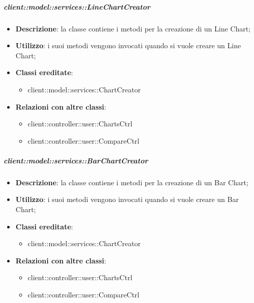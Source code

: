 		\subparagraph{client::model::services::LineChartCreator} %
		\label{subp:linechartcreator}
			\begin{itemize}
				\item \textbf{Descrizione}: la classe contiene i metodi per la creazione di un Line Chart;
				\item \textbf{Utilizzo}: i suoi metodi vengono invocati quando si vuole creare un Line Chart;
				\item \textbf{Classi ereditate}:
					\begin{itemize}
						\item client::model::services::ChartCreator
					\end{itemize}
				\item \textbf{Relazioni con altre classi}:
					\begin{itemize}
						\item client::controller::user::ChartsCtrl
						\item client::controller::user::CompareCtrl
					\end{itemize}
			\end{itemize}


		\subparagraph{client::model::services::BarChartCreator} %
		\label{subp:barchartcreator}
			\begin{itemize}
				\item \textbf{Descrizione}: la classe contiene i metodi per la creazione di un Bar Chart;
				\item \textbf{Utilizzo}: i suoi metodi vengono invocati quando si vuole creare un Bar Chart;
				\item \textbf{Classi ereditate}:
					\begin{itemize}
						\item client::model::services::ChartCreator
					\end{itemize}
				\item \textbf{Relazioni con altre classi}:
					\begin{itemize}
						\item client::controller::user::ChartsCtrl
						\item client::controller::user::CompareCtrl
					\end{itemize}
			\end{itemize}

